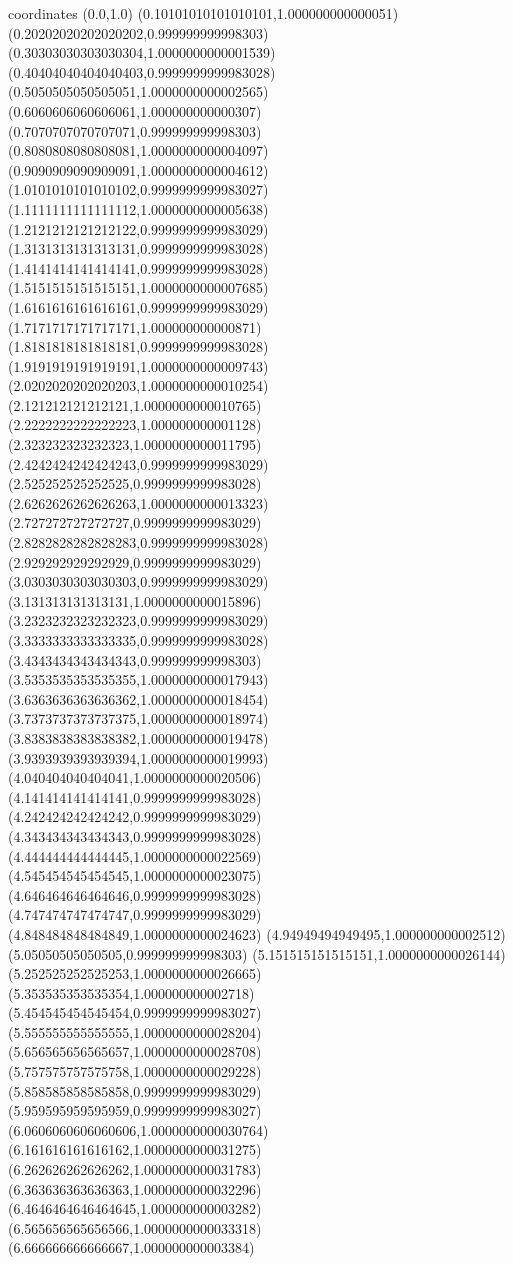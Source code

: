 coordinates {%
(0.0,1.0)
(0.10101010101010101,1.000000000000051)
(0.20202020202020202,0.999999999998303)
(0.30303030303030304,1.0000000000001539)
(0.40404040404040403,0.9999999999983028)
(0.5050505050505051,1.0000000000002565)
(0.6060606060606061,1.000000000000307)
(0.7070707070707071,0.999999999998303)
(0.8080808080808081,1.0000000000004097)
(0.9090909090909091,1.0000000000004612)
(1.0101010101010102,0.9999999999983027)
(1.1111111111111112,1.0000000000005638)
(1.2121212121212122,0.9999999999983029)
(1.3131313131313131,0.9999999999983028)
(1.4141414141414141,0.9999999999983028)
(1.5151515151515151,1.0000000000007685)
(1.6161616161616161,0.9999999999983029)
(1.7171717171717171,1.000000000000871)
(1.8181818181818181,0.9999999999983028)
(1.9191919191919191,1.0000000000009743)
(2.0202020202020203,1.0000000000010254)
(2.121212121212121,1.0000000000010765)
(2.2222222222222223,1.000000000001128)
(2.323232323232323,1.0000000000011795)
(2.4242424242424243,0.9999999999983029)
(2.525252525252525,0.9999999999983028)
(2.6262626262626263,1.0000000000013323)
(2.727272727272727,0.9999999999983029)
(2.8282828282828283,0.9999999999983028)
(2.929292929292929,0.9999999999983029)
(3.0303030303030303,0.9999999999983029)
(3.131313131313131,1.0000000000015896)
(3.2323232323232323,0.9999999999983029)
(3.3333333333333335,0.9999999999983028)
(3.4343434343434343,0.999999999998303)
(3.5353535353535355,1.0000000000017943)
(3.6363636363636362,1.0000000000018454)
(3.7373737373737375,1.0000000000018974)
(3.8383838383838382,1.0000000000019478)
(3.9393939393939394,1.0000000000019993)
(4.040404040404041,1.0000000000020506)
(4.141414141414141,0.9999999999983028)
(4.242424242424242,0.9999999999983029)
(4.343434343434343,0.9999999999983028)
(4.444444444444445,1.0000000000022569)
(4.545454545454545,1.0000000000023075)
(4.646464646464646,0.9999999999983028)
(4.747474747474747,0.9999999999983029)
(4.848484848484849,1.0000000000024623)
(4.94949494949495,1.000000000002512)
(5.05050505050505,0.999999999998303)
(5.151515151515151,1.0000000000026144)
(5.252525252525253,1.0000000000026665)
(5.353535353535354,1.000000000002718)
(5.454545454545454,0.9999999999983027)
(5.555555555555555,1.0000000000028204)
(5.656565656565657,1.0000000000028708)
(5.757575757575758,1.0000000000029228)
(5.858585858585858,0.9999999999983029)
(5.959595959595959,0.9999999999983027)
(6.0606060606060606,1.0000000000030764)
(6.161616161616162,1.0000000000031275)
(6.262626262626262,1.0000000000031783)
(6.363636363636363,1.0000000000032296)
(6.4646464646464645,1.000000000003282)
(6.565656565656566,1.0000000000033318)
(6.666666666666667,1.000000000003384)
}
